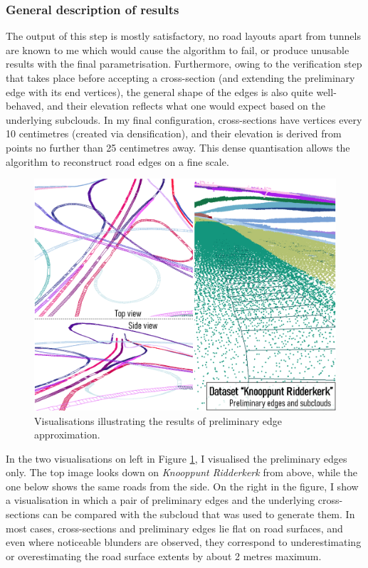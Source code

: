 \subsubsection{General description of results}

The output of this step is mostly satisfactory, no road layouts apart from tunnels are known to me which would cause the algorithm to fail, or produce unusable results with the final parametrisation. Furthermore, owing to the verification step that takes place before accepting a cross-section (and extending the preliminary edge with its end vertices), the general shape of the edges is also quite well-behaved, and their elevation reflects what one would expect based on the underlying subclouds. In my final configuration, cross-sections have vertices every 10 centimetres (created via densification), and their elevation is derived from points no further than 25 centimetres away. This dense quantisation allows the algorithm to reconstruct road edges on a fine scale.

\begin{figure}
    \centering
    \includegraphics[width=0.9\linewidth]{final_report/figs/edgeapproximation0.png}
    \caption{Visualisations illustrating the results of preliminary edge approximation.}
    \label{fig:edgeapproximation0}
\end{figure}

In the two visualisations on left in Figure \ref{fig:edgeapproximation0}, I visualised the preliminary edges only. The top image looks down on \textit{Knooppunt Ridderkerk} from above, while the one below shows the same roads from the side. On the right in the figure, I show a visualisation in which a pair of preliminary edges and the underlying cross-sections can be compared with the subcloud that was used to generate them. In most cases, cross-sections and preliminary edges lie flat on road surfaces, and even where noticeable blunders are observed, they correspond to underestimating or overestimating the road surface extents by about 2 metres maximum.

